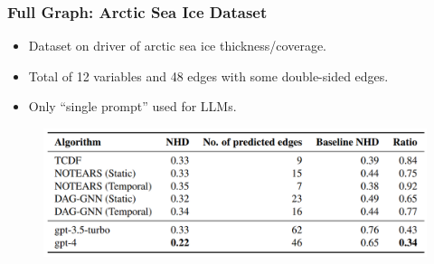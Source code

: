 \documentclass{beamer}
\begin{document}
\begin{frame}
	\frametitle{Full Graph: Arctic Sea Ice Dataset}
	\begin{itemize}
		\item Dataset on driver of arctic sea ice thickness/coverage.
		\item Total of 12 variables and 48 edges with some double-sided edges.
		\item Only ``single prompt'' used for LLMs.
	\end{itemize}
	\begin{figure}
		\includegraphics[scale=0.4]{imgs/table7.png}
	\end{figure}
\end{frame}
\end{document}
